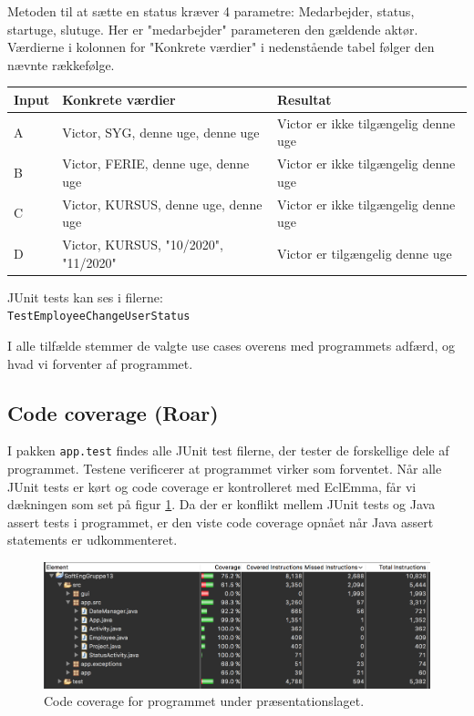 Metoden til at sætte en status kræver 4 parametre: Medarbejder, status, startuge, slutuge. Her er "medarbejder" parameteren den gældende aktør. Værdierne i kolonnen for "Konkrete værdier" i nedenstående tabel følger den nævnte rækkefølge. 

\begin{table}[H]
    \centering
    \begin{tabular}{|l|l|l|}
    \hline
    \textbf{Input} &     \textbf{Konkrete værdier} & \textbf{Resultat}     \\ \hline
    A     & Victor, SYG, denne uge, denne uge    & Victor er ikke tilgængelig denne uge \\ \hline
    B     & Victor, FERIE, denne uge, denne uge    & Victor er ikke tilgængelig denne uge \\ \hline
    C     & Victor, KURSUS, denne uge, denne uge    & Victor er ikke tilgængelig denne uge \\ \hline
    D     & Victor, KURSUS, "10/2020", "11/2020"    & Victor er tilgængelig denne uge \\ \hline

    \end{tabular}
\end{table}

JUnit tests kan ses i filerne: \\
\texttt{TestEmployeeChangeUserStatus}


I alle tilfælde stemmer de valgte use cases overens med programmets adfærd, og hvad vi forventer af programmet. 


\subsection{Code coverage (Roar)}

I pakken \texttt{app.test} findes alle JUnit test filerne, der tester de forskellige dele af programmet. Testene verificerer at programmet virker som forventet. Når alle JUnit tests er kørt og code coverage er kontrolleret med EclEmma, får vi dækningen som set på figur \ref{fig:eclemma}. Da der er konflikt mellem JUnit tests og Java assert tests i programmet, er den viste code coverage opnået når Java assert statements er udkommenteret.

\begin{figure}[H]
    \centering
    \includegraphics[width = \textwidth]{Figurer/CodeCoverage}
    \caption{Code coverage for programmet under præsentationslaget.}
    \label{fig:eclemma}
\end{figure}

